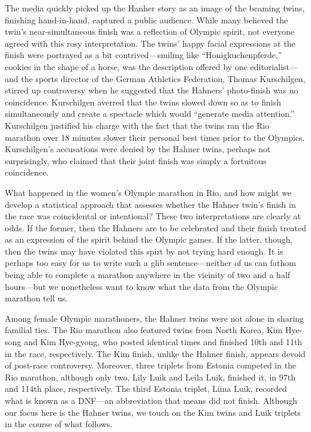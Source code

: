 \documentclass[12pt,titlepage]{article}
\begin{document}

The media quickly picked up the Hanher story as an image of the
beaming twins, finishing hand-in-hand, captured a public
audience. While many believed the twin's near-simultaneous finish was
a reflection of Olympic spirit, not everyone agreed with this rosy
interpretation. The twins' happy facial expressions at the finish were
portrayed as a bit contrived---smiling like ``Honigkuchenpferde,''
cookies in the shape of a horse, was the description offered by one
editorialist---and the sports director of the German Athletics
Federation, Thomas Kurschilgen, stirred up controversy when he
suggested that the Hahners' photo-finish was no coincidence.
Kurschilgen averred that the twins slowed down so as to finish
simultaneously and create a spectacle which would ``generate media
attention.''  Kurschilgen justified his charge with the fact that the
twins ran the Rio marathon over 18 minutes slower their personal best
times prior to the Olympics.  Kurschilgen's accusations were denied by
the Hahner twins, perhaps not surprisingly, who claimed that their
joint finish was simply a fortuitous coincidence.


What happened in the women's Olympic marathon in Rio, and how might we
develop a statistical approach that assesses whether the Hahner twin's
finish in the race was coincidental or intentional?  These two
interpretations are clearly at odds. If the former, then the Hahners
are to be celebrated and their finish treated as an expression of the
spirit behind the Olympic games. If the latter, though, then the twins
may have violated this spirt by not trying hard enough. It is perhaps
too easy for us to write such a glib sentence---neither of us can
fathom being able to complete a marathon anywhere in the vicinity of
two and a half hours---but we nonetheless want to know what the data
from the Olympic marathon tell us.


Among female Olympic marathoners, the Hahner twins were not alone in
sharing familial ties.  The Rio marathon also featured twins from
North Korea, Kim Hye-song and Kim Hye-gyong, who posted identical
times and finished 10th and 11th in the race, respectively. The Kim
finish, unlike the Hahner finish, appears devoid of post-race
controversy. Moreover, three triplets from Estonia competed in the Rio
marathon, although only two, Lily Luik and Leila Luik, finished it, in
97th and 114th place, respectively. The third Estonia triplet, Liina
Luik, recorded what is known as a DNF---an abbreviation that means did
not finish.  Although our focus here is the Hahner twins, we touch on
the Kim twins and Luik triplets in the course of what follows.
\end{document}
